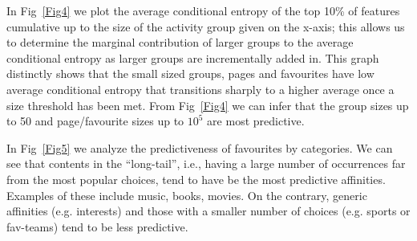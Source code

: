 In Fig~\ref{Fig4} we plot the average conditional entropy of the top
    10\% of features cumulative up to the size of the activity group given on the
    x-axis; this allows us to determine the marginal contribution of
    larger groups to the average conditional entropy as larger groups
    are incrementally added in.  This graph 
    distinctly shows that the small sized groups, pages and favourites
    have low average conditional entropy that transitions sharply to a
    higher average once a size threshold has been met. From 
    Fig~\ref{Fig4} we can infer that the group sizes up to 50 and
    page/favourite sizes up to $10^{5}$ are most predictive.
    
    
    In Fig~\ref{Fig5}  we analyze the predictiveness of favourites by categories.
    We can see that contents in the ``long-tail'', i.e.,  
    having a large number of occurrences far from the most popular choices, 
    tend to have be the most predictive affinities. Examples of these include
    music, books, movies. On the contrary, generic affinities (e.g. interests) and 
    those with a smaller number of choices (e.g. sports or fav-teams) 
    tend to be less predictive. 



   
   

